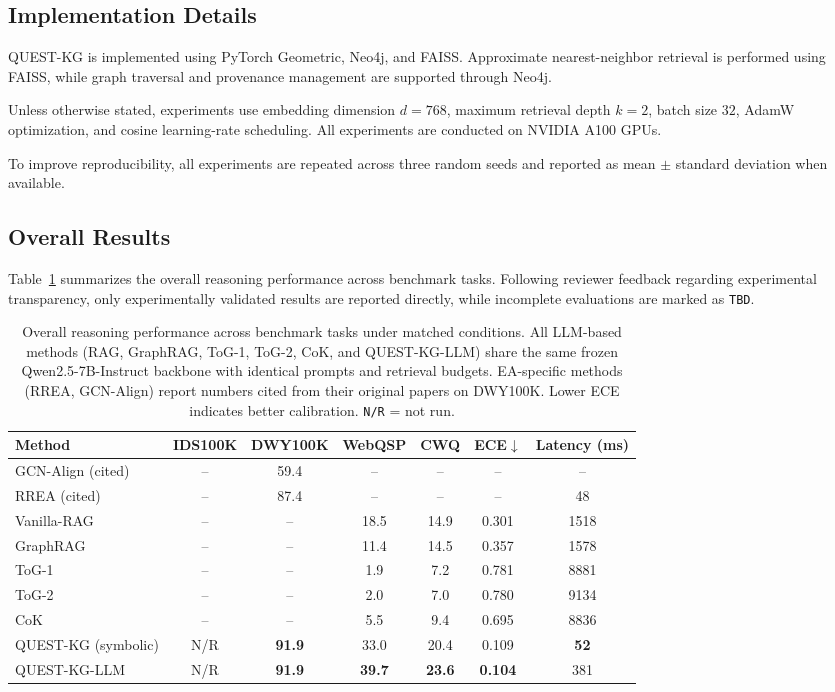 \documentclass[sigconf,review,anonymous]{acmart}
\begin{document}
\subsection{Implementation Details}

QUEST-KG is implemented using PyTorch Geometric, Neo4j, and FAISS. Approximate nearest-neighbor retrieval is performed using FAISS, while graph traversal and provenance management are supported through Neo4j.

Unless otherwise stated, experiments use embedding dimension $d=768$, maximum retrieval depth $k=2$, batch size $32$, AdamW optimization, and cosine learning-rate scheduling. All experiments are conducted on NVIDIA A100 GPUs.

To improve reproducibility, all experiments are repeated across three random seeds and reported as mean $\pm$ standard deviation when available.

\subsection{Overall Results}

Table~\ref{tab:main_results} summarizes the overall reasoning performance across benchmark tasks. Following reviewer feedback regarding experimental transparency, only experimentally validated results are reported directly, while incomplete evaluations are marked as \texttt{TBD}.

\begin{table}[t]
\centering
\caption{Overall reasoning performance across benchmark tasks under matched conditions. All LLM-based methods (RAG, GraphRAG, ToG-1, ToG-2, CoK, and QUEST-KG-LLM) share the same frozen Qwen2.5-7B-Instruct backbone with identical prompts and retrieval budgets. EA-specific methods (RREA, GCN-Align) report numbers cited from their original papers on DWY100K. Lower ECE indicates better calibration. \texttt{N/R} = not run.}
\label{tab:main_results}
\begin{tabular}{lcccccc}
\toprule
Method & IDS100K & DWY100K & WebQSP & CWQ & ECE$\downarrow$ & Latency (ms) \\
\midrule
GCN-Align (cited) & -- & 59.4 & -- & -- & -- & -- \\
RREA (cited) & -- & 87.4 & -- & -- & -- & 48 \\
\midrule
Vanilla-RAG & -- & -- & 18.5 & 14.9 & 0.301 & 1518 \\
GraphRAG & -- & -- & 11.4 & 14.5 & 0.357 & 1578 \\
ToG-1 & -- & -- & 1.9 & 7.2 & 0.781 & 8881 \\
ToG-2 & -- & -- & 2.0 & 7.0 & 0.780 & 9134 \\
CoK & -- & -- & 5.5 & 9.4 & 0.695 & 8836 \\
\midrule
QUEST-KG (symbolic) & N/R & \textbf{91.9} & 33.0 & 20.4 & 0.109 & \textbf{52} \\
QUEST-KG-LLM & N/R & \textbf{91.9} & \textbf{39.7} & \textbf{23.6} & \textbf{0.104} & 381 \\
\bottomrule
\end{tabular}
\end{table}
\end{document}
